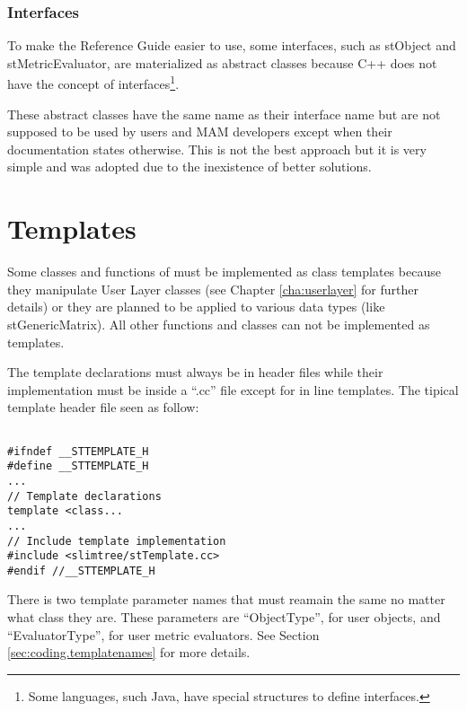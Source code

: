 \subsubsection{Interfaces}

To make the Reference Guide easier to use, some interfaces, such as stObject and stMetricEvaluator, are materialized as abstract classes because C++ does not have the concept of interfaces\footnote{Some languages, such Java, have special structures to define interfaces.}.

These abstract classes have the same name as their interface name but are not supposed to be used by users and MAM developers except when their documentation states otherwise. This is not the best approach but it is very simple and was adopted due to the inexistence of better solutions.

\section{Templates}
\label{sec:coding.templates}

Some classes and functions of \libname{ } must be implemented as class templates because they manipulate User Layer classes (see Chapter \ref{cha:userlayer} for further details) or they are planned to be applied to various data types (like stGenericMatrix). All other functions and classes can not be implemented as templates.

The template declarations must always be in header files while their implementation must be inside a ``.cc'' file except for in line templates. The tipical template header file seen as follow:

\begin{code}
\begin{verbatim}

#ifndef __STTEMPLATE_H
#define __STTEMPLATE_H
...
// Template declarations
template <class...
...
// Include template implementation
#include <slimtree/stTemplate.cc>
#endif //__STTEMPLATE_H
\end{verbatim}
\end{code}


There is two template parameter names that must reamain the same no matter what class they are. These parameters are ``ObjectType'', for user objects, and ``EvaluatorType'', for user metric evaluators. See Section \ref{sec:coding.templatenames} for more details.

